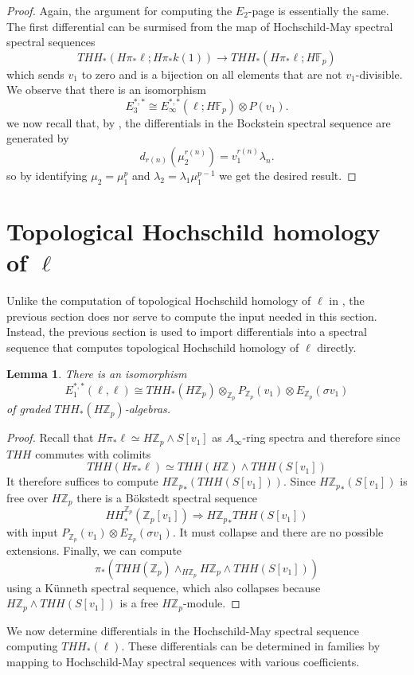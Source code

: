 \documentclass[12pt]{amsart}
\newcommand{\Z}{\mathbb{Z}}
\newcommand{\F}{\mathbb{F}}
\newtheorem{lem}[equation]{Lemma}
\theoremstyle{definition}
\numberwithin{equation}{section}
\numberwithin{figure}{section}
\begin{document}
\begin{proof}
Again, the argument for computing the $E_2$-page is essentially the same. The first differential can be surmised from the map of Hochschild-May spectral spectral sequences
\[ THH_*(H\pi_*\ell;H\pi_*k(1))\to THH_*(H\pi_*\ell;H\F_p)\]
which sends $v_1$ to zero and is a bijection on all elements that are not $v_1$-divisible. We observe that there is an isomorphism 
\[ E_3^{*,*}\cong E_{\infty}^{*,*}(\ell;H\F_p)\otimes P(v_1).\]
we now recall that, by \cite{McClureStaffeldt}, the differentials in the Bockstein spectral sequence are generated by 
\[ d_{r(n)}(\mu_2^{r(n)})=v_1^{r(n)}\lambda_n.\]
so by identifying $\mu_2=\mu_1^p$ and $\lambda_2=\lambda_1\mu_1^{p-1}$ we get the desired result.
\end{proof}
\section{Topological Hochschild homology of $\ell$}
Unlike the computation of topological Hochschild homology of $\ell$ in \cite{AHL}, the previous section does nor serve to compute the input needed in this section. Instead, the previous section is used to import differentials into a spectral sequence that computes topological Hochschild homology of $\ell$ directly. 
\begin{lem}
There is an isomorphism
\[ E_1^{*,*}(\ell,\ell)\cong THH_*(H\Z_p)\otimes_{\Z_p}P_{\Z_p}(v_1)\otimes E_{\Z_p}(\sigma v_1)\]
of graded $THH_*(H\Z_p)$-algebras. 
\end{lem}
\begin{proof}
Recall that $H\pi_*\ell\simeq H\Z_p\wedge S[v_1]$ as $A_{\infty}$-ring spectra and therefore since $THH$ commutes with colimits
\[ THH(H\pi_*\ell)\simeq THH(H\Z)\wedge THH(S[v_1])\]
It therefore suffices to compute ${H\Z_p}_*(THH(S[v_1]))$. Since ${H\Z_p}_*(S[v_1])$ is free over $H\Z_p$ there is a B\"okstedt spectral sequence 
\[ HH_*^{\Z_p}(\Z_p[v_1])\Rightarrow {H\Z_p}_*THH(S[v_1])\]
with input $P_{\Z_p}(v_1)\otimes E_{\Z_p}(\sigma v_1)$. It must collapse and there are no possible extensions. Finally, we can compute
\[ \pi_*(THH(\Z_p)\wedge_{H\Z_p}H\Z_p\wedge THH(S[v_1])) \]
using a K\"unneth spectral sequence, which also collapses because $H\Z_p\wedge THH(S[v_1])$ is a free $H\Z_p$-module. 
\end{proof}
We now determine differentials in the Hochschild-May spectral sequence computing $THH_*(\ell)$. These differentials can be determined in families by mapping to Hochschild-May spectral sequences with various coefficients. 
\end{document}
